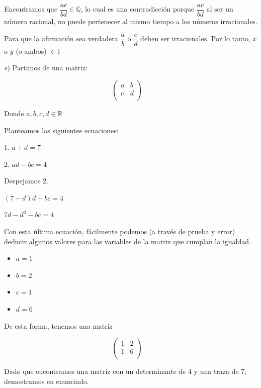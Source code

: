\documentclass[11pt,a4paper]{article}
\begin{document}
\begin{enumerate}
Encontramos que $\dfrac{ac}{bd} \in \mathbb{Q}$, lo cual es una contradicción porque $\dfrac{ac}{bd}$ al ser un número racional, no puede pertenecer al mismo tiempo a los números irracionales.

Para que la afirmación sea verdadera $\dfrac{a}{b}$ o $\dfrac{c}{d}$ deben ser irracionales. Por lo tanto, $x$ o $y$ (o ambos) $\in \mathbb{I}$

\vspace{0.5cm}

\textit{e}) Partimos de una matriz:


$$
\begin{pmatrix} 
a & b \\
c & d \\
\end{pmatrix}
\quad
$$

Donde $a, b, c, d \in \mathbb{R}$

Planteamos las siguientes ecuaciones:

\begin{center}

1. $a + d = 7$

2. $ad - bc = 4$

\end{center}

Despejamos 2.

\begin{center}

$(7-d)d - bc = 4$

$7d-d^2-bc = 4$

\end{center}

Con esta última ecuación, fácilmente podemos (a través de prueba y error) deducir algunos valores para las variables de la matriz que cumplan la igualdad.


\begin{itemize}
\item $a = 1$
\item $b = 2$
\item $c = 1$
\item $d = 6$
\end{itemize}

De esta forma, tenemos una matriz

$$
\begin{pmatrix} 
1 & 2 \\
1 & 6 \\
\end{pmatrix}
\quad
$$

Dado que encontramos una matriz con un determinante de 4 y una traza de 7, demostramos en enunciado.


\end{enumerate}
\end{document}
